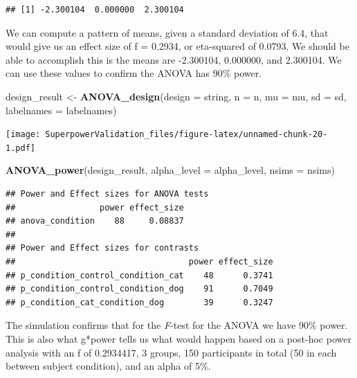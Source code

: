 \documentclass[]{book}
\newenvironment{Shaded}{\begin{snugshade}}{\end{snugshade}}
\newcommand{\DataTypeTok}[1]{\textcolor[rgb]{0.13,0.29,0.53}{#1}}
\newcommand{\KeywordTok}[1]{\textcolor[rgb]{0.13,0.29,0.53}{\textbf{#1}}}
\newcommand{\NormalTok}[1]{#1}
\newcommand{\StringTok}[1]{\textcolor[rgb]{0.31,0.60,0.02}{#1}}
\begin{document}
\begin{verbatim}
## [1] -2.300104  0.000000  2.300104
\end{verbatim}

We can compute a pattern of means, given a standard deviation of 6.4, that would give us an effect size of f = 0.2934, or eta-squared of 0.0793. We should be able to accomplish this is the means are -2.300104, 0.000000, and 2.300104. We can use these values to confirm the ANOVA has 90\% power.

\begin{Shaded}
\begin{Highlighting}[]
\NormalTok{design_result <-}\StringTok{ }\KeywordTok{ANOVA_design}\NormalTok{(}\DataTypeTok{design =}\NormalTok{ string,}
                   \DataTypeTok{n =}\NormalTok{ n, }
                   \DataTypeTok{mu =}\NormalTok{ mu, }
                   \DataTypeTok{sd =}\NormalTok{ sd, }
                   \DataTypeTok{labelnames =}\NormalTok{ labelnames)}
\end{Highlighting}
\end{Shaded}

\texttt{[image: SuperpowerValidation\_files/figure-latex/unnamed-chunk-20-1.pdf]}

\begin{Shaded}
\begin{Highlighting}[]
\KeywordTok{ANOVA_power}\NormalTok{(design_result, }\DataTypeTok{alpha_level =}\NormalTok{ alpha_level, }\DataTypeTok{nsims =}\NormalTok{ nsims)}
\end{Highlighting}
\end{Shaded}

\begin{verbatim}
## Power and Effect sizes for ANOVA tests
##                 power effect_size
## anova_condition    88     0.08837
## 
## Power and Effect sizes for contrasts
##                                   power effect_size
## p_condition_control_condition_cat    48      0.3741
## p_condition_control_condition_dog    91      0.7049
## p_condition_cat_condition_dog        39      0.3247
\end{verbatim}

The simulation confirms that for the \emph{F}-test for the ANOVA we have 90\% power. This is also what g*power tells us what would happen based on a post-hoc power analysis with an f of 0.2934417, 3 groups, 150 participants in total (50 in each between subject condition), and an alpha of 5\%.
\end{document}
